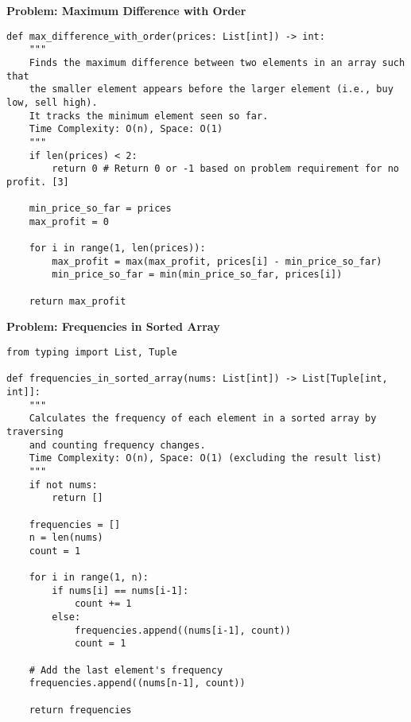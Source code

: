 \noindent\textbf{Problem: Maximum Difference with Order}
\begin{verbatim}
def max_difference_with_order(prices: List[int]) -> int:
    """
    Finds the maximum difference between two elements in an array such that
    the smaller element appears before the larger element (i.e., buy low, sell high).
    It tracks the minimum element seen so far.
    Time Complexity: O(n), Space: O(1)
    """
    if len(prices) < 2:
        return 0 # Return 0 or -1 based on problem requirement for no profit. [3]

    min_price_so_far = prices
    max_profit = 0

    for i in range(1, len(prices)):
        max_profit = max(max_profit, prices[i] - min_price_so_far)
        min_price_so_far = min(min_price_so_far, prices[i])
    
    return max_profit
\end{verbatim}

\noindent\textbf{Problem: Frequencies in Sorted Array}
\begin{verbatim}
from typing import List, Tuple

def frequencies_in_sorted_array(nums: List[int]) -> List[Tuple[int, int]]:
    """
    Calculates the frequency of each element in a sorted array by traversing
    and counting frequency changes.
    Time Complexity: O(n), Space: O(1) (excluding the result list)
    """
    if not nums:
        return []
    
    frequencies = []
    n = len(nums)
    count = 1
    
    for i in range(1, n):
        if nums[i] == nums[i-1]:
            count += 1
        else:
            frequencies.append((nums[i-1], count))
            count = 1
    
    # Add the last element's frequency
    frequencies.append((nums[n-1], count))
    
    return frequencies
\end{verbatim}

